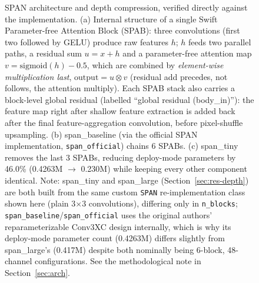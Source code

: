 \documentclass[11pt]{article}
\begin{document}
\begin{figure}[H]
{%
}
\caption{SPAN architecture and depth compression, verified directly against the implementation. (a) Internal structure of a single Swift Parameter-free Attention Block (SPAB): three convolutions (first two followed by GELU) produce raw features $h$; $h$ feeds two parallel paths, a residual sum $u = x + h$ and a parameter-free attention map $v = \mathrm{sigmoid}(h) - 0.5$, which are combined by \emph{element-wise multiplication last}, $\text{output} = u \otimes v$ (residual add precedes, not follows, the attention multiply). Each SPAB stack also carries a block-level global residual (labelled ``global residual (body\_in)''): the feature map right after shallow feature extraction is added back after the final feature-aggregation convolution, before pixel-shuffle upsampling. (b) span\_baseline (via the official SPAN implementation, \texttt{span\_official}) chains 6 SPABs. (c) span\_tiny removes the last 3 SPABs, reducing deploy-mode parameters by 46.0\% (0.4263M $\to$ 0.230M) while keeping every other component identical. Note: span\_tiny and span\_large (Section~\ref{sec:res-depth}) are both built from the same custom \texttt{SPAN} re-implementation class shown here (plain 3$\times$3 convolutions), differing only in \texttt{n\_blocks}; \texttt{span\_baseline}/\texttt{span\_official} uses the original authors' reparameterizable Conv3XC design internally, which is why its deploy-mode parameter count (0.4263M) differs slightly from span\_large's (0.417M) despite both nominally being 6-block, 48-channel configurations. See the methodological note in Section~\ref{sec:arch}.}
\label{fig:arch}
\end{figure}
\end{document}
